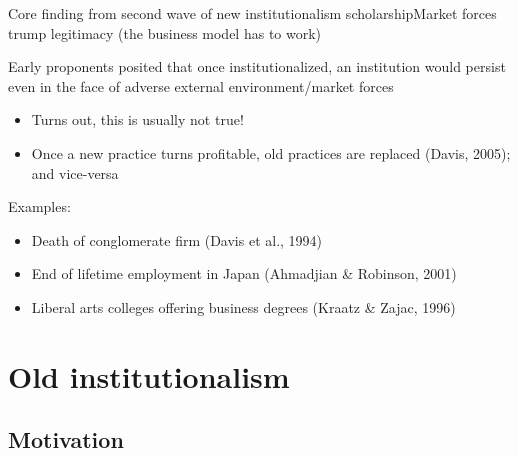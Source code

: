 \begin{frame}{Core finding from second wave of new institutionalism scholarship}{Market forces trump legitimacy (the business model has to work)}

	Early proponents posited that once institutionalized, an institution would persist even in the face of adverse external environment/market forces
	\begin{itemize}
		\item Turns out, this is usually not true!
		\item Once a new practice turns profitable, old practices are replaced (Davis, 2005); and vice-versa
	\end{itemize}
	\vspace{2mm}
	
	Examples:
	\begin{itemize}
		\item Death of conglomerate firm (Davis et al., 1994)
		\item End of lifetime employment in Japan (Ahmadjian \& Robinson, 2001)
		\item Liberal arts colleges offering business degrees (Kraatz \& Zajac, 1996)
	\end{itemize}
	
\end{frame}

\section[Old institutionalism]{Old institutionalism}

\subsection{Motivation}

